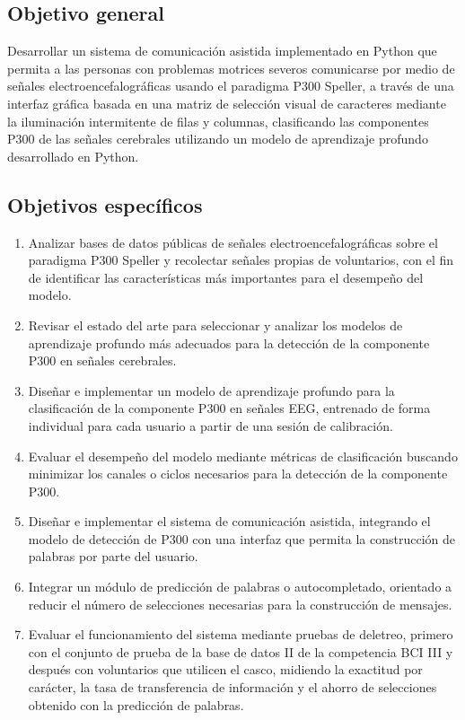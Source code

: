\subsection{Objetivo general}

Desarrollar un sistema de comunicación asistida implementado en Python que permita a las
personas con problemas motrices severos comunicarse por medio de señales
electroencefalográficas usando el paradigma P300 Speller, a través de una interfaz gráfica
basada en una matriz de selección visual de caracteres mediante la iluminación intermitente de
filas y columnas, clasificando las componentes P300 de las señales cerebrales utilizando un
modelo de aprendizaje profundo desarrollado en Python.

\subsection{Objetivos específicos}

\begin{enumerate}
    \item Analizar bases de datos públicas de señales electroencefalográficas sobre el
    paradigma P300 Speller y recolectar señales propias de voluntarios, con el fin de
    identificar las características más importantes para el desempeño del modelo.
    \item Revisar el estado del arte para seleccionar y analizar los modelos de aprendizaje
    profundo más adecuados para la detección de la componente P300 en señales cerebrales.
    \item Diseñar e implementar un modelo de aprendizaje profundo para la clasificación de la
    componente P300 en señales EEG, entrenado de forma individual para cada usuario a partir
    de una sesión de calibración.
    \item Evaluar el desempeño del modelo mediante métricas de clasificación buscando minimizar
    los canales o ciclos necesarios para la detección de la componente P300.
    \item Diseñar e implementar el sistema de comunicación asistida, integrando el modelo de
    detección de P300 con una interfaz que permita la construcción de palabras por parte del
    usuario.
    \item Integrar un módulo de predicción de palabras o autocompletado, orientado a reducir el
    número de selecciones necesarias para la construcción de mensajes.
    \item Evaluar el funcionamiento del sistema mediante pruebas de deletreo, primero con el
    conjunto de prueba de la base de datos II de la competencia BCI III y después con voluntarios
    que utilicen el casco, midiendo la exactitud por carácter, la tasa de transferencia de
    información y el ahorro de selecciones obtenido con la predicción de palabras.
\end{enumerate}

